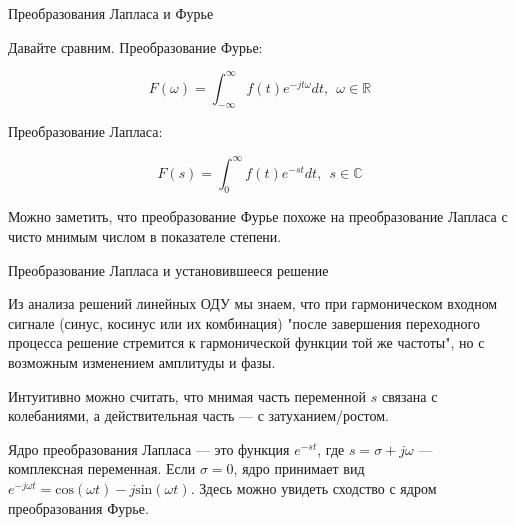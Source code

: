 \documentclass{beamer}
\begin{document}
\begin{frame}{Преобразования Лапласа и Фурье}
	\begin{flushleft}
		
		Давайте сравним. Преобразование Фурье:
		
		\begin{equation}
			F(\omega) = \int_{-\infty}^\infty f(t) e^{-j t \omega} dt, \ \ \omega \in \mathbb{R}
		\end{equation}
		
		Преобразование Лапласа:
		
		\begin{equation}
			F(s) = \int_0^\infty f(t) e^{-st}dt, \ \ s \in \mathbb{C}
		\end{equation}
		
		Можно заметить, что преобразование Фурье похоже на преобразование Лапласа с чисто мнимым числом в показателе степени.
		
	\end{flushleft}
\end{frame}

\begin{frame}{Преобразование Лапласа и установившееся решение}
	\begin{flushleft}
		
		Из анализа решений линейных ОДУ мы знаем, что при гармоническом входном сигнале (синус, косинус или их комбинация) "после завершения переходного процесса решение стремится к гармонической функции той же частоты", но с возможным изменением амплитуды и фазы.
		
		\bigskip
		
		Интуитивно можно считать, что мнимая часть переменной $s$ связана с колебаниями, а действительная часть — с затуханием/ростом. 
		
		\bigskip
		Ядро преобразования Лапласа — это функция $e^{-st}$, где $s = \sigma + j \omega$ — комплексная переменная. Если $\sigma = 0$, ядро принимает вид $e^{-j \omega t} = \text{cos}(\omega t) - j \text{sin}(\omega t)$. Здесь можно увидеть сходство с ядром преобразования Фурье.
		
	\end{flushleft}
\end{frame}
\end{document}
